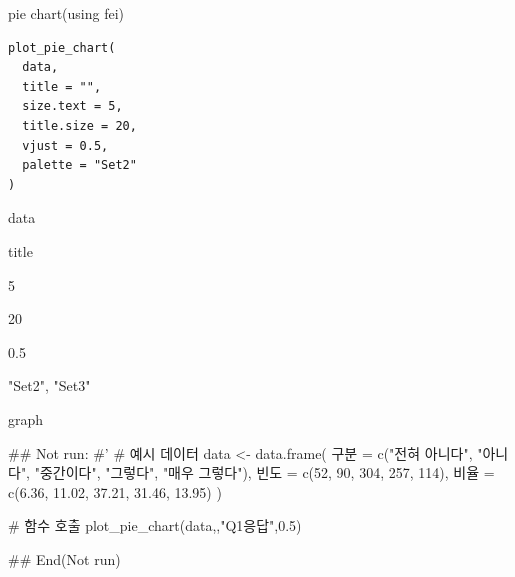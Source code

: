 \documentclass[a4paper]{book}
\begin{document}
%
\begin{Description}
pie chart(using fei)
\end{Description}
%
\begin{Usage}
\begin{verbatim}
plot_pie_chart(
  data,
  title = "",
  size.text = 5,
  title.size = 20,
  vjust = 0.5,
  palette = "Set2"
)
\end{verbatim}
\end{Usage}
%
\begin{Arguments}
\begin{ldescription}
\item[\code{data}] data

\item[\code{title}] title

\item[\code{size.text}] 5

\item[\code{title.size}] 20

\item[\code{vjust}] 0.5

\item[\code{palette}] "Set2", "Set3"
\end{ldescription}
\end{Arguments}
%
\begin{Value}
graph
\end{Value}
%
\begin{Examples}
\begin{ExampleCode}

\#\# Not run: 
#'
# 예시 데이터
data <- data.frame(
  구분 = c("전혀 아니다", "아니다", "중간이다", "그렇다", "매우 그렇다"),
  빈도 = c(52, 90, 304, 257, 114),
  비율 = c(6.36, 11.02, 37.21, 31.46, 13.95)
)

# 함수 호출
plot_pie_chart(data,,"Q1응답",0.5)

## End(Not run)

\end{ExampleCode}
\end{Examples}
\end{document}
